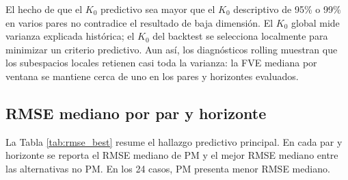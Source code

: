 \documentclass[a4paper,11pt]{article}
\begin{document}
El hecho de que el \(K_0\) predictivo sea mayor que el \(K_0\) descriptivo de 95\% o 99\% en varios pares no contradice el resultado de baja dimensión. El \(K_0\) global mide varianza explicada histórica; el \(K_0\) del backtest se selecciona localmente para minimizar un criterio predictivo. Aun así, los diagnósticos rolling muestran que los subespacios locales retienen casi toda la varianza: la FVE mediana por ventana se mantiene cerca de uno en los pares y horizontes evaluados.

\subsection{RMSE mediano por par y horizonte}

La Tabla \ref{tab:rmse_best} resume el hallazgo predictivo principal. En cada par y horizonte se reporta el RMSE mediano de PM y el mejor RMSE mediano entre las alternativas no PM. En los 24 casos, PM presenta menor RMSE mediano.
\end{document}
